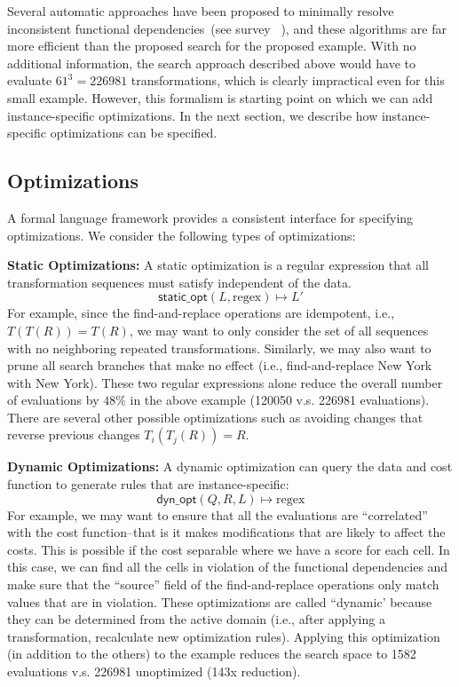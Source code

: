 Several automatic approaches have been proposed to minimally resolve inconsistent functional dependencies~(see survey ~\cite{DBLP:conf/sigmod/ChuIKW16}), and these algorithms are far more efficient than the proposed search for the proposed example.
With no additional information, the search approach described above would have to evaluate $61^3 = 226981$ transformations, which is clearly impractical even for this small example.
However, this formalism is starting point on which we can add instance-specific optimizations.
In the next section, we describe how instance-specific optimizations can be specified.


\subsection{Optimizations}
A formal language framework provides a consistent interface for specifying optimizations. We consider the following types of optimizations:

\vspace{0.5em}\noindent\textbf{Static Optimizations: } A static optimization is a regular expression that all transformation sequences must satisfy independent of the data. 
\[\textsf{static\_opt}(L, \text{regex} ) \mapsto L'\]
For example, since the find-and-replace operations are idempotent, i.e., $T(T(R)) = T(R)$, we may want to only consider the set of all sequences with no neighboring repeated transformations. Similarly, we may also want to prune all search branches that make no effect (i.e., find-and-replace New York with New York).
These two regular expressions alone reduce the overall number of evaluations by $48\%$ in the above example (120050 v.s. 226981 evaluations).
There are several other possible optimizations  such as avoiding changes that reverse previous changes $T_i(T_j(R)) = R$.


\vspace{0.5em}\noindent\textbf{Dynamic Optimizations: } A dynamic optimization can query the data and cost function to generate rules that are instance-specific:
\[\textsf{dyn\_opt}(Q, R, L) \mapsto \text{regex}\]
For example, we may want to ensure that all the evaluations are ``correlated'' with the cost function--that is it makes modifications that are likely to affect the costs.
This is possible if the cost separable where we have a score for each cell. In this case, we can find all the cells in violation of the functional dependencies and make sure that the ``source'' field of the find-and-replace operations only match values that are in violation.
These optimizations are called ``dynamic' because they can be determined from the active domain (i.e., after applying a transformation, recalculate new optimization rules).
Applying this optimization (in addition to the others) to the example reduces the search space to 1582 evaluations v.s. 226981 unoptimized (143x reduction).

